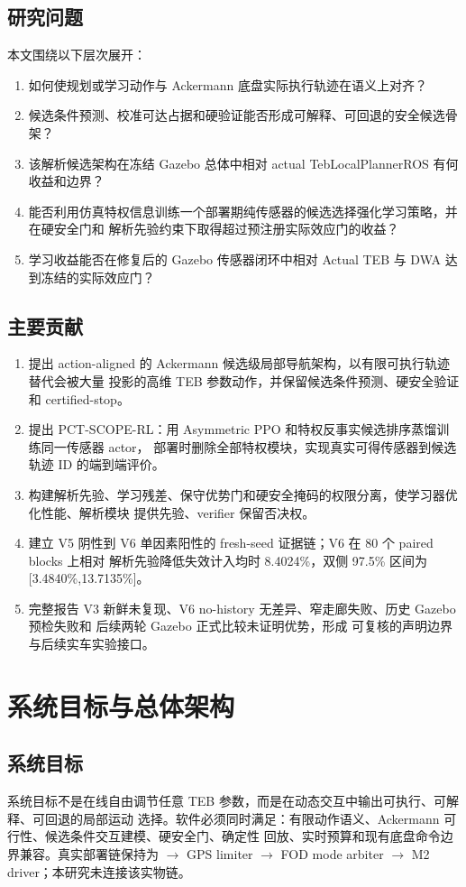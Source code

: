 \documentclass[12pt,a4paper,oneside]{report}
\begin{document}
\section{研究问题}
本文围绕以下层次展开：
\begin{enumerate}
  \item 如何使规划或学习动作与 Ackermann 底盘实际执行轨迹在语义上对齐？
  \item 候选条件预测、校准可达占据和硬验证能否形成可解释、可回退的安全候选骨架？
  \item 该解析候选架构在冻结 Gazebo 总体中相对 actual TebLocalPlannerROS 有何收益和边界？
  \item 能否利用仿真特权信息训练一个部署期纯传感器的候选选择强化学习策略，并在硬安全门和
  解析先验约束下取得超过预注册实际效应门的收益？
  \item 学习收益能否在修复后的 Gazebo 传感器闭环中相对 Actual TEB 与 DWA 达到冻结的实际效应门？
\end{enumerate}

\section{主要贡献}
\begin{enumerate}
  \item 提出 action-aligned 的 Ackermann 候选级局部导航架构，以有限可执行轨迹替代会被大量
  投影的高维 TEB 参数动作，并保留候选条件预测、硬安全验证和 certified-stop。
  \item 提出 PCT-SCOPE-RL：用 Asymmetric PPO 和特权反事实候选排序蒸馏训练同一传感器 actor，
  部署时删除全部特权模块，实现真实可得传感器到候选轨迹 ID 的端到端评价。
  \item 构建解析先验、学习残差、保守优势门和硬安全掩码的权限分离，使学习器优化性能、解析模块
  提供先验、verifier 保留否决权。
  \item 建立 V5 阴性到 V6 单因素阳性的 fresh-seed 证据链；V6 在 80 个 paired blocks 上相对
  解析先验降低失效计入均时 8.4024\%，双侧 97.5\% 区间为 [3.4840\%,13.7135\%]。
  \item 完整报告 V3 新鲜未复现、V6 no-history 无差异、窄走廊失败、历史 Gazebo 预检失败和
  后续两轮 Gazebo 正式比较未证明优势，形成
  可复核的声明边界与后续实车实验接口。
\end{enumerate}

\chapter{系统目标与总体架构}
\section{系统目标}
系统目标不是在线自由调节任意 TEB 参数，而是在动态交互中输出可执行、可解释、可回退的局部运动
选择。软件必须同时满足：有限动作语义、Ackermann 可行性、候选条件交互建模、硬安全门、确定性
回放、实时预算和现有底盘命令边界兼容。真实部署链保持为
 $\rightarrow$ GPS limiter $\rightarrow$ FOD mode arbiter
$\rightarrow$ M2 driver；本研究未连接该实物链。
\end{document}
